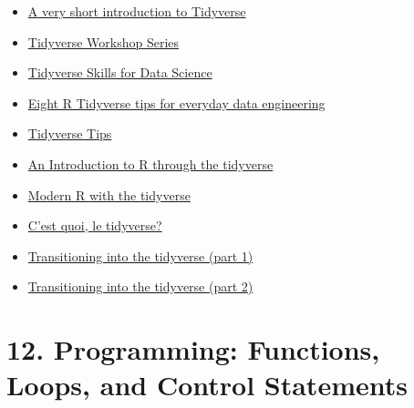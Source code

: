 \documentclass[
  letterpaper,
  DIV=11,
  numbers=noendperiod]{scrreprt}
\providecommand{\tightlist}{%
  \setlength{\itemsep}{0pt}\setlength{\parskip}{0pt}}\usepackage{longtable,booktabs,array}
\begin{document}
\begin{itemize}
\tightlist
\item
  \href{https://dominicroye.github.io/en/2020/a-very-short-introduction-to-tidyverse/}{A
  very short introduction to Tidyverse}
\item
  \href{https://github.com/nuitrcs/r-tidyverse}{Tidyverse Workshop
  Series}
\item
  \href{https://jhudatascience.org/tidyversecourse/}{Tidyverse Skills
  for Data Science}
\item
  \href{https://tomaztsql.wordpress.com/2022/07/14/eight-r-tidyverse-tips-for-everyday-data-engineering/}{Eight
  R Tidyverse tips for everyday data engineering}
\item
  \href{https://oliviergimenez.github.io/tidyverse-tips/}{Tidyverse
  Tips}
\item
  \href{https://pmacdasci.github.io/r-intro-tidyverse/}{An Introduction
  to R through the tidyverse}
\item
  \href{http://modern-rstats.eu/}{Modern R with the tidyverse}
\item
  \href{https://thinkr.fr/c-est-quoi-le-tidyverse/\#Mettre_en_forme_ses_donnees_avec_la_package_tidyr}{C'est
  quoi, le tidyverse?}
\item
  \href{https://www.rebeccabarter.com/blog/2019-08-05_base_r_to_tidyverse/}{Transitioning
  into the tidyverse (part 1)}
\item
  \href{https://www.rebeccabarter.com/blog/2019-08-05_base_r_to_tidyverse_pt2/}{Transitioning
  into the tidyverse (part 2)}
\end{itemize}

\hypertarget{programming-functions-loops-and-control-statements}{%
\section*{12. Programming: Functions, Loops, and Control
Statements}\label{programming-functions-loops-and-control-statements}}

\end{document}
